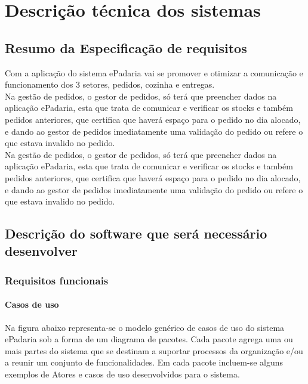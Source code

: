 
\chapter{Descrição técnica dos sistemas}
\label{descricao_tecnica_dos_sistemas}

\section{Resumo da Especificação de requisitos}
Com a aplicação do sistema ePadaria vai se promover e otimizar a comunicação e funcionamento dos 3 setores, pedidos, cozinha e entregas.\\
Na gestão de pedidos, o gestor de pedidos, só terá que preencher dados na aplicação ePadaria, esta que trata de comunicar e verificar os stocks e também pedidos anteriores, que certifica que haverá espaço para o pedido no dia alocado, e dando ao gestor de pedidos imediatamente uma validação do pedido ou
refere o que estava invalido no pedido.\\
Na gestão de pedidos, o gestor de pedidos, só terá que preencher dados na aplicação ePadaria, esta que trata de comunicar e verificar os stocks e também pedidos anteriores, que certifica que haverá espaço para o pedido no dia alocado, e dando ao gestor de pedidos imediatamente uma validação do pedido ou refere o que estava invalido no pedido.\\


\section{Descrição do software que será necessário desenvolver}
\subsection{Requisitos funcionais}
\subsubsection{Casos de uso}
Na figura abaixo representa-se o modelo genérico de casos de uso do sistema ePadaria sob a forma de um diagrama de pacotes. Cada pacote agrega uma ou mais partes do sistema que se destinam a suportar processos da organização e/ou a reunir um conjunto de funcionalidades. Em cada pacote incluem-se alguns exemplos de Atores e casos de uso desenvolvidos para o sistema.

